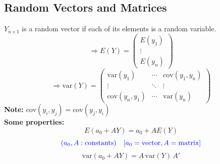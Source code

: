 \documentclass[14pt]{extarticle}
\begin{document}
\subsection*{Random Vectors and Matrices}

\noindent
$Y_{n \times 1}$ is a random vector if each of its elements is a random variable.
\[
\Longrightarrow E(Y) = \begin{pmatrix}
E(y_1) \\
\vdots \\
E(y_n)
\end{pmatrix}
\]
\[
\Longrightarrow \text{var}(Y) = \begin{pmatrix}
\text{var}(y_1) & \cdots & \text{cov}(y_1, y_n) \\
\vdots & \ddots & \vdots \\
\text{cov}(y_n, y_1) & \cdots & \text{var}(y_n)
\end{pmatrix}
\]
\textbf{Note:} \quad $\text{cov}(y_i, y_j) = \text{cov}(y_j, y_i)$\\
\textbf{Some properties:}
\[
E(a_0 + A Y) = a_0 + A E(Y)
\]
\[
\textcolor{blue}{(a_0, A: \text{constants}) \quad \text{[}a_0 = \text{vector}, A = \text{matrix}\text{]}}
\]
\[
\text{var}(a_0 + A Y) = A \, \text{var}(Y) \, A'
\]
\end{document}
